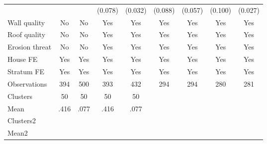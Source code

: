 {\begin{tabular}{l*{8}{c}}
                &                  &                  &  (0.078)         &  (0.032)         &  (0.088)         &  (0.057)         &  (0.100)         &  (0.027)         \\
Wall quality    &       No         &       No         &      Yes         &      Yes         &      Yes         &      Yes         &      Yes         &      Yes         \\
Roof quality    &       No         &       No         &      Yes         &      Yes         &      Yes         &      Yes         &      Yes         &      Yes         \\
Erosion threat  &       No         &       No         &      Yes         &      Yes         &      Yes         &      Yes         &      Yes         &      Yes         \\
House FE        &      Yes         &      Yes         &      Yes         &      Yes         &      Yes         &      Yes         &      Yes         &      Yes         \\
Stratum FE      &      Yes         &      Yes         &      Yes         &      Yes         &      Yes         &      Yes         &      Yes         &      Yes         \\
\hline
Observations    &      394         &      500         &      393         &      432         &      294         &      294         &      280         &      281         \\
Clusters        &       50         &       50         &       50         &       50         &                  &                  &                  &                  \\
Mean            &     .416         &     .077         &     .416         &     .077         &                  &                  &                  &                  \\
Clusters2       &                  &                  &                  &                  &                  &                  &                  &                  \\
Mean2           &                  &                  &                  &                  &                  &                  &                  &                  \\
\hline\hline
\end{tabular}
}
